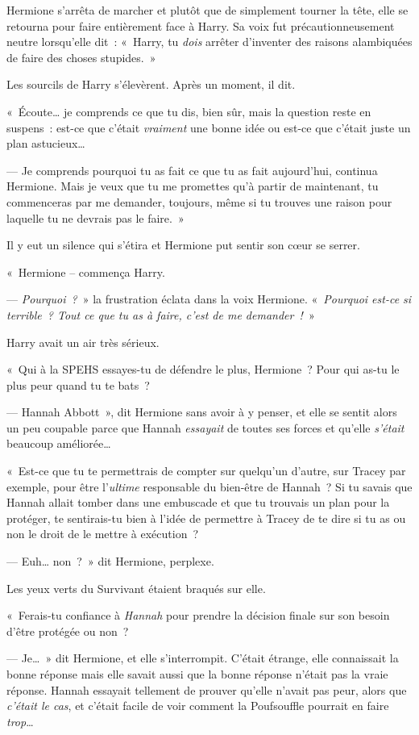 Hermione s'arrêta de marcher et plutôt que de simplement tourner la tête, elle se retourna pour faire entièrement face à Harry.
Sa voix fut précautionneusement neutre lorsqu'elle dit~: «~Harry, tu \emph{dois} arrêter d'inventer des raisons alambiquées de faire des choses stupides.~»

Les sourcils de Harry s'élevèrent.
Après un moment, il dit.

«~Écoute… je comprends ce que tu dis, bien sûr, mais la question reste en suspens~: est-ce que c'était \emph{vraiment} une bonne idée ou est-ce que c'était juste un plan astucieux…

--- Je comprends pourquoi tu as fait ce que tu as fait aujourd'hui, continua Hermione.
Mais je veux que tu me promettes qu'à partir de maintenant, tu commenceras par me demander, toujours, même si tu trouves une raison pour laquelle tu ne devrais pas le faire.~»

Il y eut un silence qui s'étira et Hermione put sentir son cœur se serrer.

«~Hermione -- commença Harry.

--- \emph{Pourquoi~?}~» la frustration éclata dans la voix Hermione.
«~\emph{Pourquoi est-ce si terrible~?
Tout ce que tu as à faire, c'est de me demander~!}~»

Harry avait un air très sérieux.

«~Qui à la SPEHS essayes-tu de défendre le plus, Hermione~?
Pour qui as-tu le plus peur quand tu te bats~?

--- Hannah Abbott~», dit Hermione sans avoir à y penser, et elle se sentit alors un peu coupable parce que Hannah \emph{essayait} de toutes ses forces et qu'elle \emph{s'était} beaucoup améliorée…

«~Est-ce que tu te permettrais de compter sur quelqu'un d'autre, sur Tracey par exemple, pour être l'\emph{ultime} responsable du bien-être de Hannah~?
Si tu savais que Hannah allait tomber dans une embuscade et que tu trouvais un plan pour la protéger, te sentirais-tu bien à l'idée de permettre à Tracey de te dire si tu as ou non le droit de le mettre à exécution~?

--- Euh… non~?~»
dit Hermione, perplexe.

Les yeux verts du Survivant étaient braqués sur elle.

«~Ferais-tu confiance à \emph{Hannah} pour prendre la décision finale sur son besoin d'être protégée ou non~?

--- Je…~» dit Hermione, et elle s'interrompit.
C'était étrange, elle connaissait la bonne réponse mais elle savait aussi que la bonne réponse n'était pas la vraie réponse.
Hannah essayait tellement de prouver qu'elle n'avait pas peur, alors que \emph{c'était le cas}, et c'était facile de voir comment la Poufsouffle pourrait en faire \emph{trop}…

